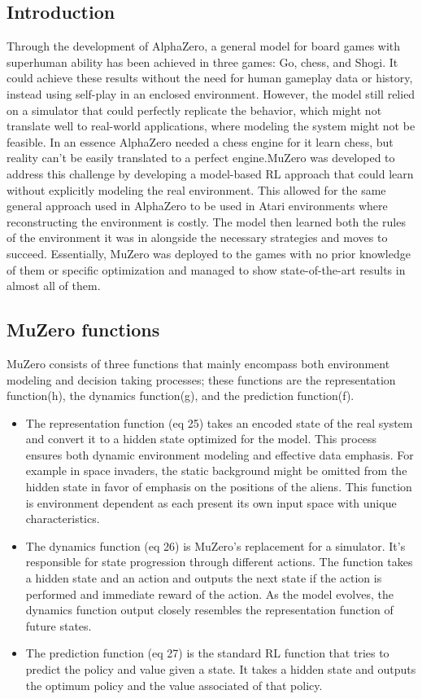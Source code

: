 
\subsection{Introduction}
Through the development of AlphaZero, a general model for board games with
superhuman ability has been achieved in three games: Go, chess, and Shogi. It
could achieve these results without the need for human gameplay data or
history, instead using self-play in an enclosed environment. However, the model
still relied on a simulator that could perfectly replicate the behavior, which
might not translate well to real-world applications, where modeling the system
might not be feasible. In an essence AlphaZero needed a chess engine for it learn chess, but reality can't be easily translated to a perfect engine.MuZero was developed to address this challenge by developing a model-based RL approach that could learn without explicitly
modeling the real environment. This allowed for the same general approach used
in AlphaZero to be used in Atari environments where reconstructing the
environment is costly. The model then learned both the rules of the environment it was in alongside the necessary strategies and moves to succeed.
Essentially, MuZero was deployed to the games with
no prior knowledge of them or specific optimization and managed to show
state-of-the-art results in almost all of them. 

\subsection{MuZero functions}

MuZero consists of three functions that mainly encompass both environment modeling and decision taking processes; these functions are the representation function(h), the dynamics function(g), and the prediction function(f). 

\begin{itemize}
    \item The representation function (eq 25) takes an encoded state of the real system and convert it to a hidden state optimized for the model. This process ensures both dynamic environment modeling and effective data emphasis. For example in space invaders, the static background might be omitted from the hidden state in favor of emphasis on the positions of the aliens. This function is environment dependent as each present its own input space with unique characteristics.
    \item The dynamics function (eq 26) is MuZero's replacement for a simulator. It's responsible for state progression through different actions. The function takes a hidden state and an action and outputs the next state if the action is performed and immediate reward of the action. As the model evolves, the dynamics function output closely resembles the representation function of future states. 
    \item The prediction function (eq 27) is the standard RL function that tries to predict the policy and value given a state. It takes a hidden state and outputs the optimum policy and the value associated of that policy. 
\end{itemize}

